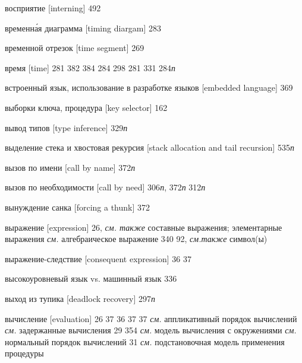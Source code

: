 \begin{theindex}
\item {восприятие [interning]} 492
\item {временн\'ая диаграмма [timing diargam]} 283
\item {временной отрезок [time segment]} 269
\item {время [time]} 281
   382
   384
   284
   298
   281
   331
   284{\it п}
\item {встроенный язык, использование в разработке языков [embedded language]} 369
\item {выборки ключа, процедура [key selector]} 162
\item {вывод типов [type inference]} 329{\it п}
\item {выделение стека и хвостовая рекурсия [stack allocation and tail recursion]} 535{\it п}
\item {вызов по имени [call by name]} 372{\it п}
\item {вызов по необходимости [call by need]} 306{\it п}, 372{\it п}
   312{\it п}
\item {вынуждение санка [forcing a thunk]} 372
\item {выражение [expression]} 26, {\it см. также} составные выражения; элементарные выражения
   {\it см.} алгебраическое выражение
   340
   92, {\it см.также} символ(ы)
\item {выражение-следствие [consequent expression]}
   36
   37
\item {высокоуровневый язык vs. машинный язык} 336
\item {выход из тупика [deadlock recovery]} 297{\it п}
\item {вычисление [evaluation]} 26
   37
   36
   37
   37
   {\it см.} аппликативный порядок вычислений
   {\it см.} задержанные вычисления
   29
   354
   {\it см.} модель вычисления с окружениями
   {\it см.} нормальный порядок вычислений 
   31
   {\it см.} подстановочная модель применения процедуры

\end{theindex}

